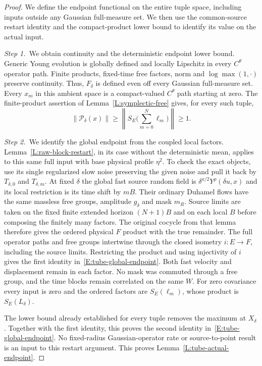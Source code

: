 \begin{proof}
  We define the endpoint functional on the entire tuple space, including
  inputs outside any Gaussian full-measure set. We then use the common-source
  restart identity and the compact-product lower bound to identify its value
  on the actual input.


  \medskip
  \noindent\textit{Step 1.~}We obtain continuity and the deterministic
  endpoint lower bound.
  Generic Young evolution is globally defined and locally Lipschitz in every
  $C^\theta$ operator path. Finite products, fixed-time free factors, norm and
  $\log\max(1,\cdot)$ preserve continuity. Thus, $F_\delta$ is defined even off
  every Gaussian full-measure set. Every $x_m$ in this ambient space is a
  compact-valued $C^\theta$ path starting at zero. The finite-product assertion
  of Lemma~\ref{L:symplectic-free} gives, for every such tuple,
  \[
    \|\mathcal{P}_\delta(x)\|
    \ge\left\|S_E\Big(\sum_{m=0}^N\ell_m\Big)\right\|\ge1 .
  \]


  \medskip
  \noindent\textit{Step 2.~}We identify the global endpoint from the coupled
  local factors.
  Lemma~\ref{L:raw-block-restart}, in its case without the deterministic mean,
  applies to this same full input with base physical profile $\eta^2$. To check
  the exact objects, use its single regularized slow noise preserving the given
  noise and pull it back by $T_{\delta,0}$ and $T_{\delta,m}$. At fixed $\delta$
  the global fast source random field is $\delta^{a/2}Y^\rho(\delta u,x)$ and
  its local restriction is its time shift by $mB$. Their ordinary Duhamel flows
  have the same massless free groups, amplitude $g_\delta$ and mask $m_R$.
  Source limits are taken on the fixed finite extended horizon $(N+1)B$ and on
  each local $B$ before composing the finitely many factors. The original
  cocycle from that lemma therefore gives the ordered physical $F$ product with
  the true remainder. The full operator paths and free groups intertwine through
  the closed isometry $i:E \to F$, including the source limits. Restricting the
  product and using injectivity of $i$ gives the first identity
  in~\eqref{E:tube-global-endpoint}. Both fast velocity and displacement remain
  in each factor. No mask was commuted through a free group, and the time blocks
  remain correlated on the same $W$. For zero covariance every input is zero and
  the ordered factors are $S_E(\ell_m)$, whose product is $S_E(L_\delta)$.

  The lower bound already established for every tuple removes the maximum at
  $X_\delta$. Together with the first identity, this proves the second identity
  in~\eqref{E:tube-global-endpoint}. No fixed-radius Gaussian-operator rate or
  source-to-point result is an input to this restart argument. This proves
  Lemma~\ref{L:tube-actual-endpoint}.
\end{proof}

